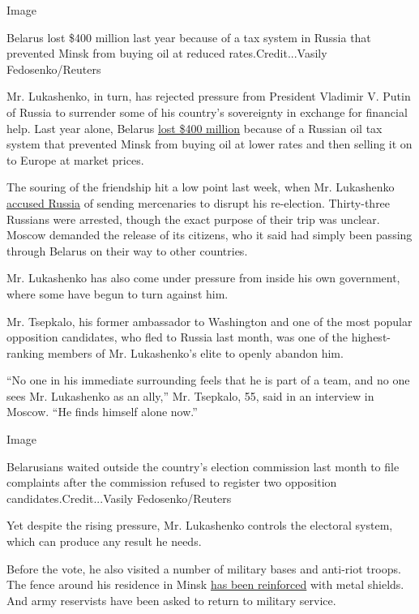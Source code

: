 Image

Belarus lost \$400 million last year because of a tax system in Russia
that prevented Minsk from buying oil at reduced rates.Credit...Vasily
Fedosenko/Reuters

Mr. Lukashenko, in turn, has rejected pressure from President Vladimir
V. Putin of Russia to surrender some of his country's sovereignty in
exchange for financial help. Last year alone, Belarus
\href{https://blr.belta.by/economics/view/minfin-belarusi-atsenvae-straty-z-za-padatkovaga-maneuru-u-2020-godze-u-pamery-400-mln-82002-2019/}{lost
\$400 million} because of a Russian oil tax system that prevented Minsk
from buying oil at lower rates and then selling it on to Europe at
market prices.

The souring of the friendship hit a low point last week, when Mr.
Lukashenko
\href{https://www.nytimes.com/2020/07/29/world/europe/belarus-russian-mercenaries-lukashenko.html}{accused
Russia} of sending mercenaries to disrupt his re-election. Thirty-three
Russians were arrested, though the exact purpose of their trip was
unclear. Moscow demanded the release of its citizens, who it said had
simply been passing through Belarus on their way to other countries.

Mr. Lukashenko has also come under pressure from inside his own
government, where some have begun to turn against him.

Mr. Tsepkalo, his former ambassador to Washington and one of the most
popular opposition candidates, who fled to Russia last month, was one of
the highest-ranking members of Mr. Lukashenko's elite to openly abandon
him.

``No one in his immediate surrounding feels that he is part of a team,
and no one sees Mr. Lukashenko as an ally,'' Mr. Tsepkalo, 55, said in
an interview in Moscow. ``He finds himself alone now.''

Image

Belarusians waited outside the country's election commission last month
to file complaints after the commission refused to register two
opposition candidates.Credit...Vasily Fedosenko/Reuters

Yet despite the rising pressure, Mr. Lukashenko controls the electoral
system, which can produce any result he needs.

Before the vote, he also visited a number of military bases and
anti-riot troops. The fence around his residence in Minsk
\href{https://twitter.com/TadeuszGiczan/status/1267553203366899718}{has
been reinforced} with metal shields. And army reservists have been asked
to return to military service.


